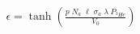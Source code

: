 


\begin{eqnarray*}
  \epsilon = \tanh \left( \frac{p \; N_a \; \ell \; \sigma_a \; \lambda \;  P_{^{3}He}}{V_0} \right)
\end{eqnarray*}


